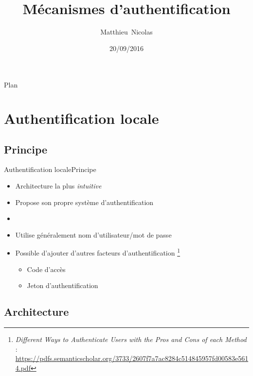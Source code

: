 \documentclass{beamer}
\title{Mécanismes d'authentification}
\subtitle{}
\author{Matthieu~Nicolas}
\date{20/09/2016}
\begin{document}
\begin{frame}
  \titlepage
\end{frame}

\begin{frame}{Plan}
  \tableofcontents
\end{frame}

\section{Authentification locale}

\subsection{Principe}

\begin{frame}{Authentification locale}{Principe}
  \begin{center}
    \begin{itemize}
      \item Architecture la plus \emph{intuitive}
      \item Propose son propre système d'authentification
      \item[~]
      \item Utilise généralement nom d'utilisateur/mot de passe
      \item {
        Possible d'ajouter d'autres facteurs d'authentification
        \footnote[frame]{
          \emph{Different Ways to Authenticate Users with the Pros and Cons of each Method} :
          \url{https://pdfs.semanticscholar.org/3733/2607f7a7ac8284c514845957fd00583e5614.pdf}
        }
      }
      \begin{itemize}
        \item Code d'accès
        \item Jeton d'authentification
      \end{itemize}
    \end{itemize}
  \end{center}
\end{frame}

\subsection{Architecture}
\end{document}
